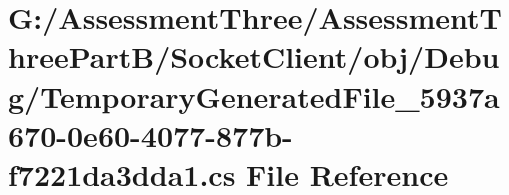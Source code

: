 \hypertarget{_socket_client_2obj_2_debug_2_temporary_generated_file__5937a670-0e60-4077-877b-f7221da3dda1_8cs}{}\section{G\+:/\+Assessment\+Three/\+Assessment\+Three\+Part\+B/\+Socket\+Client/obj/\+Debug/\+Temporary\+Generated\+File\+\_\+5937a670-\/0e60-\/4077-\/877b-\/f7221da3dda1.cs File Reference}
\label{_socket_client_2obj_2_debug_2_temporary_generated_file__5937a670-0e60-4077-877b-f7221da3dda1_8cs}
